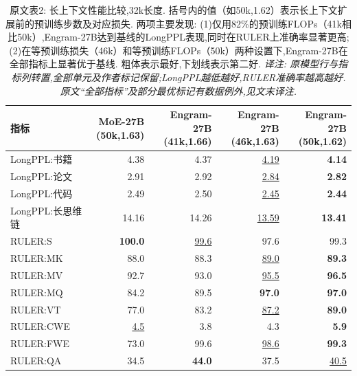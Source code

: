 \begin{table}[htbp]
\centering\begingroup\setlength{\tabcolsep}{3pt}
\caption{原文表2: 长上下文性能比较,32k长度. 括号内的值（如50k,1.62）表示长上下文扩展前的预训练步数及对应损失. 两项主要发现: (1)仅用82\%的预训练FLOPs（41k相比50k）,Engram-27B达到基线的LongPPL\cite{engram-fangwrong}表现,同时在RULER\cite{engram-hsiehruler}上准确率显著更高; (2)在等预训练损失（46k）和等预训练FLOPs（50k）两种设置下,Engram-27B在全部指标上显著优于基线. 粗体表示最好,下划线表示第二好. \textit{译注: 原模型行与指标列转置,全部单元及作者标记保留;LongPPL越低越好,RULER准确率越高越好. 原文“全部指标”及部分最优标记有数据例外,见文末译注.}}\label{engram-tab-2}
\begin{tabular}{lrrrr}\toprule
指标 & \shortstack{MoE-27B\\(50k,1.63)} & \shortstack{Engram-27B\\(41k,1.66)} & \shortstack{Engram-27B\\(46k,1.63)} & \shortstack{Engram-27B\\(50k,1.62)} \\
\midrule
LongPPL:书籍 & 4.38 & 4.37 & \underline{4.19} & \textbf{4.14} \\
LongPPL:论文 & 2.91 & 2.92 & \underline{2.84} & \textbf{2.82} \\
LongPPL:代码 & 2.49 & 2.50 & \underline{2.45} & \textbf{2.44} \\
LongPPL:长思维链 & 14.16 & 14.26 & \underline{13.59} & \textbf{13.41} \\
RULER:S & \textbf{100.0} & \underline{99.6} & 97.6 & 99.3 \\
RULER:MK & 88.0 & 88.3 & \underline{89.0} & \textbf{89.3} \\
RULER:MV & 92.7 & 93.0 & \underline{95.5} & \textbf{96.5} \\
RULER:MQ & 84.2 & 89.5 & \textbf{97.0} & \textbf{97.0} \\
RULER:VT & 77.0 & 83.2 & \underline{87.2} & \textbf{89.0} \\
RULER:CWE & \underline{4.5} & 3.8 & 4.3 & \textbf{5.9} \\
RULER:FWE & 73.0 & 99.6 & \underline{98.6} & \textbf{99.3} \\
RULER:QA & 34.5 & \textbf{44.0} & 37.5 & \underline{40.5} \\
\bottomrule
\end{tabular}
\endgroup
\end{table}
